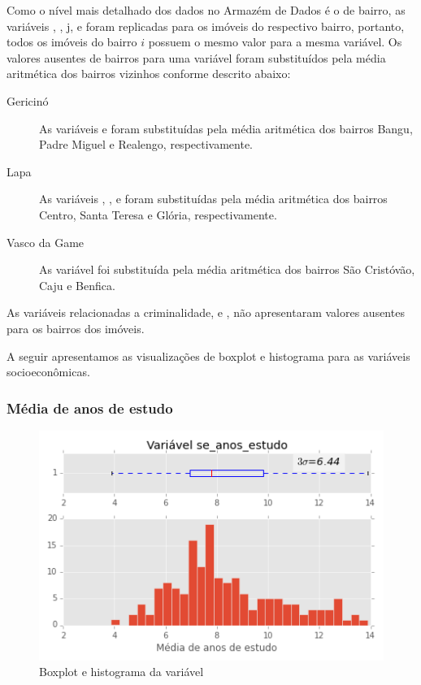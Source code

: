 Como o nível mais detalhado dos dados no Armazém de Dados é o de bairro, as variáveis , , j, e  foram replicadas para os imóveis do respectivo bairro, portanto, todos os imóveis do bairro $ i $ possuem o mesmo valor para a mesma variável. Os valores ausentes de bairros para uma variável foram substituídos pela média aritmética dos bairros vizinhos conforme descrito abaixo:

\begin{description}
	\item[Gericinó] As variáveis  e   foram substituídas pela média aritmética dos bairros Bangu, Padre Miguel e Realengo, respectivamente.

	\item[Lapa] 	As variáveis , ,  e   foram substituídas pela média aritmética dos bairros Centro, Santa Teresa e Glória, respectivamente.
	
	\item[Vasco da Game] 	As variável  foi  substituída pela média aritmética dos bairros São Cristóvão, Caju e Benfica.
		

\end{description}

As variáveis relacionadas a criminalidade,  e , não apresentaram valores ausentes para os bairros dos imóveis. 

A seguir apresentamos as visualizações de boxplot e histograma para as variáveis socioeconômicas.

\subsubsection{Média de anos de estudo}

\begin{figure}[H]
	\centering
	\includegraphics[width=0.8\linewidth]{img/var_se_anos_estudo_boxhist}
	\caption{Boxplot e histograma da variável }
	\label{fig:var_se_anos_estudo_boxhist}
\end{figure} 

